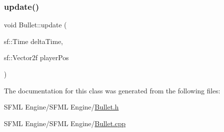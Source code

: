 \hypertarget{class_bullet_a9da6e150f1e7586f0f934b1ee029bc1a}{}\label{class_bullet_a9da6e150f1e7586f0f934b1ee029bc1a} 
\subsubsection{\texorpdfstring{update()}{update()}}
{\footnotesize\ttfamily void Bullet\+::update (\begin{DoxyParamCaption}\item[{sf\+::\+Time}]{delta\+Time,  }\item[{sf\+::\+Vector2f}]{player\+Pos }\end{DoxyParamCaption})}



The documentation for this class was generated from the following files\+:\begin{DoxyCompactItemize}
\item 
S\+F\+M\+L Engine/\+S\+F\+M\+L Engine/\hyperlink{_bullet_8h}{Bullet.\+h}\item 
S\+F\+M\+L Engine/\+S\+F\+M\+L Engine/\hyperlink{_bullet_8cpp}{Bullet.\+cpp}\end{DoxyCompactItemize}
